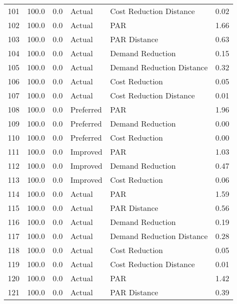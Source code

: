 \begin{longtable}{lrrllr}
101  &        100.0 &     0.0 &         Actual &    Cost Reduction Distance &   0.02 \\
102  &        100.0 &     0.0 &         Actual &                        PAR &   1.66 \\
103  &        100.0 &     0.0 &         Actual &               PAR Distance &   0.63 \\
104  &        100.0 &     0.0 &         Actual &           Demand Reduction &   0.15 \\
105  &        100.0 &     0.0 &         Actual &  Demand Reduction Distance &   0.32 \\
106  &        100.0 &     0.0 &         Actual &             Cost Reduction &   0.05 \\
107  &        100.0 &     0.0 &         Actual &    Cost Reduction Distance &   0.01 \\
108  &        100.0 &     0.0 &      Preferred &                        PAR &   1.96 \\
109  &        100.0 &     0.0 &      Preferred &           Demand Reduction &   0.00 \\
110  &        100.0 &     0.0 &      Preferred &             Cost Reduction &   0.00 \\
111  &        100.0 &     0.0 &       Improved &                        PAR &   1.03 \\
112  &        100.0 &     0.0 &       Improved &           Demand Reduction &   0.47 \\
113  &        100.0 &     0.0 &       Improved &             Cost Reduction &   0.06 \\
114  &        100.0 &     0.0 &         Actual &                        PAR &   1.59 \\
115  &        100.0 &     0.0 &         Actual &               PAR Distance &   0.56 \\
116  &        100.0 &     0.0 &         Actual &           Demand Reduction &   0.19 \\
117  &        100.0 &     0.0 &         Actual &  Demand Reduction Distance &   0.28 \\
118  &        100.0 &     0.0 &         Actual &             Cost Reduction &   0.05 \\
119  &        100.0 &     0.0 &         Actual &    Cost Reduction Distance &   0.01 \\
120  &        100.0 &     0.0 &         Actual &                        PAR &   1.42 \\
121  &        100.0 &     0.0 &         Actual &               PAR Distance &   0.39 \\

\end{longtable}
